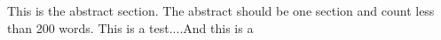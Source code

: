 This is the abstract section. The abstract should be one section and count less than 200 words. This is a test....And this is a 
